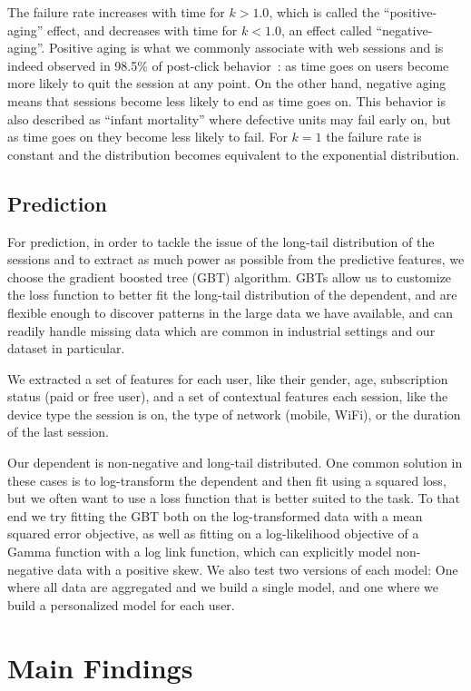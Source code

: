 The failure rate increases with time for $k > 1.0$, which is called the ``positive-aging''
effect, and decreases with time for $k < 1.0$, an effect called ``negative-aging''. Positive aging
is what we commonly associate with web sessions and is indeed observed in 98.5\% of post-click
behavior~\cite{weibull-web-browsing}: as time goes on users become more likely to quit the session
at any point. On the other hand, negative aging means that sessions become less likely to end
as time goes on. This behavior is also described as ``infant mortality'' where defective units
may fail early on, but as time goes on they become less likely to fail.
For $k = 1$ the failure rate is constant and the distribution becomes equivalent to the
exponential distribution.

\subsection{Prediction}

For prediction, in order to tackle the issue of the long-tail distribution
of the sessions and to extract as much power as possible from the predictive features,
we choose the gradient boosted tree (GBT) algorithm. GBTs allow us to customize the
loss function to better fit the long-tail distribution of the dependent, and are flexible
enough to discover patterns in the large data we have available, and can readily
handle missing data which are common in industrial settings and our dataset in
particular.

We extracted a set of features for each user, like their gender, age, subscription
status (paid or free user), and a set of contextual features each session,
like the device type the session is on, the type of network (mobile, WiFi), or
the duration of the last session.

Our dependent is non-negative and long-tail distributed. One common solution in
these cases is to log-transform the dependent and then fit using a squared
loss, but we often want to use a loss function that is better suited to the
task. To that end we try fitting the GBT both on the log-transformed data with
a mean squared error objective, as well as fitting on a log-likelihood
objective of a Gamma function with a log link function, which can explicitly
model non-negative data with a positive skew. We also test two versions
of each model: One where all data are aggregated and we build a single model,
and one where we build a personalized model for each user.


\section{Main Findings}
\label{sec:session-length-main-findings}

